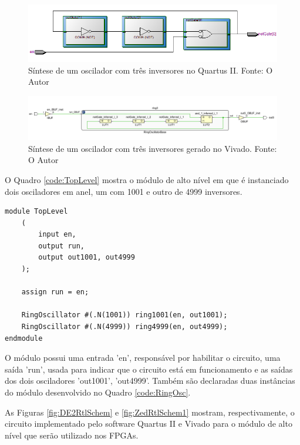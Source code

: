 \begin{figure}[H]
    \centering
    \includegraphics[width=\linewidth]{figures/Metodologia/DE2_Implementation_3Inverter_Gates.png}
    \caption{Síntese de um oscilador com três inversores no Quartus II. Fonte: O Autor}
    \label{fig:DE2Imp3Osc}
\end{figure}

\begin{figure}[H]
    \centering
    \includegraphics[width=\linewidth]{figures/Metodologia/ZedBoard_Implementation_3Inverter.png}
    \caption{Síntese de um oscilador com três inversores gerado no Vivado. Fonte: O Autor}
    \label{fig:ZedImp3Osc}
\end{figure}

O Quadro \ref{code:TopLevel} mostra o módulo de alto nível em que é instanciado dois osciladores em anel, um com 1001 e outro de 4999 inversores. 

\begin{lstlisting}[label={code:TopLevel}, style=VerilogStyle, caption={Instanciação dos Módulos. Fonte: O Autor}]
module TopLevel
	(
		input en,
		output run,
		output out1001, out4999
	);
	
	assign run = en;

	RingOscillator #(.N(1001)) ring1001(en, out1001);
	RingOscillator #(.N(4999)) ring4999(en, out4999);
endmodule
\end{lstlisting}

O módulo possui uma entrada 'en', responsável por habilitar o circuito, uma saída 'run', usada para indicar que o circuito está em funcionamento e as saídas dos dois osciladores 'out1001', 'out4999'. Também são declaradas duas instâncias do módulo desenvolvido no Quadro \ref{code:RingOsc}.

As Figuras \ref{fig:DE2RtlSchem} e \ref{fig:ZedRtlSchem1} mostram, respectivamente, o circuito implementado pelo software Quartus II e Vivado para o módulo de alto nível que serão utilizado nos FPGAs.


